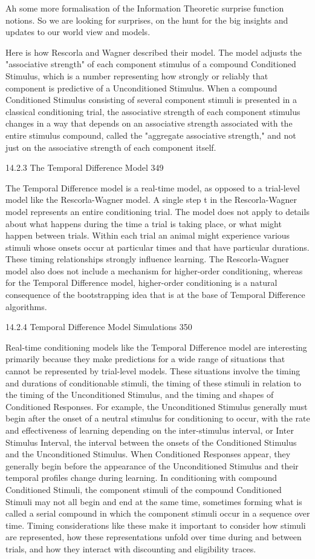 Ah some more formalisation of the Information Theoretic surprise function notions. So we are looking for surprises, on the hunt for the big insights and updates to our world view and models.

Here is how Rescorla and Wagner described their model. The model adjusts the "associative strength" of each component stimulus of a compound Conditioned Stimulus, which is a number representing how strongly or reliably that component is predictive of a Unconditioned Stimulus. When a compound Conditioned Stimulus consisting of several component stimuli is presented in a classical conditioning trial, the associative strength of each component stimulus changes in a way that depends on an associative strength associated with the entire stimulus compound, called the "aggregate associative strength," and not just on the associative strength of each component itself.

14.2.3 The Temporal Difference Model 349

The Temporal Difference model is a real-time model, as opposed to a trial-level model like the Rescorla-Wagner model. A single step t in the Rescorla-Wagner model represents an entire conditioning trial. The model does not apply to details about what happens during the time a trial is taking place, or what might happen between trials. Within each trial an animal might experience various stimuli whose onsets occur at particular times and that have particular durations. These timing relationships strongly influence learning. The Rescorla-Wagner model also does not include a mechanism for higher-order conditioning, whereas for the Temporal Difference model, higher-order conditioning is a natural consequence of the bootstrapping idea that is at the base of Temporal Difference algorithms.

14.2.4 Temporal Difference Model Simulations 350

Real-time conditioning models like the Temporal Difference model are interesting primarily because they make predictions for a wide range of situations that cannot be represented by trial-level models. These situations involve the timing and durations of conditionable stimuli, the timing of these stimuli in relation to the timing of the Unconditioned Stimulus, and the timing and shapes of Conditioned Responses. For example, the Unconditioned Stimulus generally must begin after the onset of a neutral stimulus for conditioning to occur, with the rate and effectiveness of learning depending on the inter-stimulus interval, or Inter Stimulus Interval, the interval between the onsets of the Conditioned Stimulus and the Unconditioned Stimulus. When Conditioned Responses appear, they generally begin before the appearance of the Unconditioned Stimulus and their temporal profiles change during learning. In conditioning with compound Conditioned Stimuli, the component stimuli of the compound Conditioned Stimuli may not all begin and end at the same time, sometimes forming what is called a serial compound in which the component stimuli occur in a sequence over time. Timing considerations like these make it important to consider how stimuli are represented, how these representations unfold over time during and between trials, and how they interact with discounting and eligibility traces.

